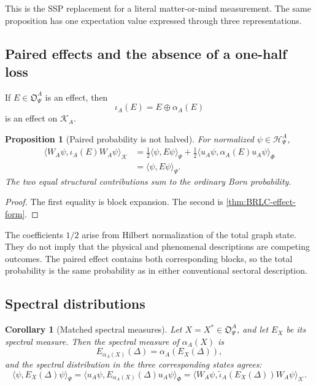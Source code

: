 \documentclass[11pt,reqno]{scrartcl}
\newcommand{\scrK}{\mathscr K}
\newcommand{\polA}{u_A}
\newcommand{\inner}[2]{\langle #1,#2\rangle}
\newcommand{\actHP}{\mathscr H_{\Psi}^{A}}
\newcommand{\actK}{\mathscr K_{A}}
\newcommand{\WA}{W_{A}}
\newcommand{\alphaA}{\alpha_{A}}
\newcommand{\iotaA}{\iota_{A}}
\newcommand{\iotaMaxA}{\widetilde{\iota}_{A}}
\newcommand{\obsP}{\mathfrak O_{\Psi}^{A}}
\theoremstyle{plain}
\newtheorem{proposition}[proposition]{Proposition}
\newtheorem{corollary}[corollary]{Corollary}
\theoremstyle{definition}
\theoremstyle{remark}
\begin{document}
This is the SSP replacement for a literal matter-or-mind measurement.  The
same proposition has one expectation value expressed through three
representations.

\subsection{Paired effects and the absence of a one-half loss}

If \(E\in\obsP\) is an effect, then
\begin{equation}
  \iotaA(E)=E\oplus\alphaA(E)
  \label{eq:paired-effect}
\end{equation}
is an effect on \(\actK\).

\begin{proposition}[Paired probability is not halved]
\label{prop:paired-probability-not-halved}
For normalized \(\psi\in\actHP\),
\begin{align}
  \inner{\WA\psi}{\iotaA(E)\WA\psi}_{\scrK}
  &=\frac12\inner{\psi}{E\psi}_{\Psi}
    +\frac12\inner{\polA\psi}{\alphaA(E)\polA\psi}_{\Phi}
  \label{eq:paired-two-halves}\\
  &=\inner{\psi}{E\psi}_{\Psi}.
  \label{eq:paired-full-probability}
\end{align}
The two equal structural contributions sum to the ordinary Born probability.
\end{proposition}

\begin{proof}
The first equality is block expansion.  The second is
\cref{thm:BRLC-effect-form}.
\end{proof}

The coefficients \(1/2\) arise from Hilbert normalization of the total graph
state.  They do not imply that the physical and phenomenal descriptions are
competing outcomes.  The paired effect contains both corresponding blocks,
so the total probability is the same probability as in either conventional
sectoral description.

\subsection{Spectral distributions}

\begin{corollary}[Matched spectral measures]
\label{cor:paired-spectral-measures}
Let \(X=X^*\in\obsP\), and let \(E_X\) be its spectral measure.  Then the
spectral measure of \(\alphaA(X)\) is
\begin{equation}
  E_{\alphaA(X)}(\Delta)=\alphaA(E_X(\Delta)),
  \label{eq:corresponding-spectral-measure}
\end{equation}
and the spectral distribution in the three corresponding states agrees:
\begin{equation}
  \inner{\psi}{E_X(\Delta)\psi}_{\Psi}
  =\inner{\polA\psi}
         {E_{\alphaA(X)}(\Delta)\polA\psi}_{\Phi}
  =\inner{\WA\psi}
         {\iotaMaxA(E_X(\Delta))\WA\psi}_{\scrK}.
  \label{eq:three-spectral-distributions}
\end{equation}
\end{corollary}
\end{document}
